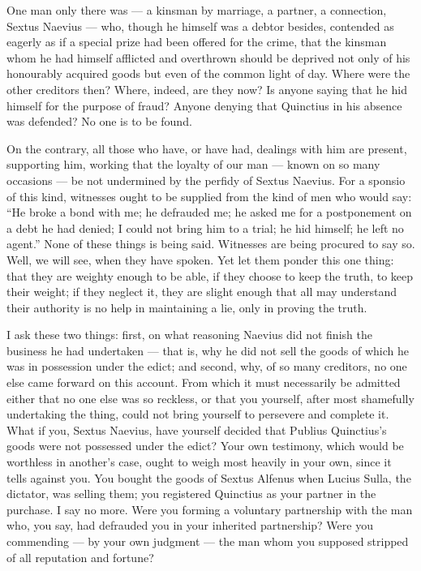  One man only there was --- a kinsman by marriage, a partner, a connection, Sextus Naevius --- who, though he himself was a debtor besides, contended as eagerly as if a special prize had been offered for the crime, that the kinsman whom he had himself afflicted and overthrown should be deprived not only of his honourably acquired goods but even of the common light of day. Where were the other creditors then? Where, indeed, are they now? Is anyone saying that he hid himself for the purpose of fraud? Anyone denying that Quinctius in his absence was defended? No one is to be found.

 On the contrary, all those who have, or have had, dealings with him are present, supporting him, working that the loyalty of our man --- known on so many occasions --- be not undermined by the perfidy of Sextus Naevius. For a sponsio of this kind, witnesses ought to be supplied from the kind of men who would say: ``He broke a bond with me; he defrauded me; he asked me for a postponement on a debt he had denied; I could not bring him to a trial; he hid himself; he left no agent.'' None of these things is being said. Witnesses are being procured to say so. Well, we will see, when they have spoken. Yet let them ponder this one thing: that they are weighty enough to be able, if they choose to keep the truth, to keep their weight; if they neglect it, they are slight enough that all may understand their authority is no help in maintaining a lie, only in proving the truth.

 I ask these two things: first, on what reasoning Naevius did not finish the business he had undertaken --- that is, why he did not sell the goods of which he was in possession under the edict; and second, why, of so many creditors, no one else came forward on this account. From which it must necessarily be admitted either that no one else was so reckless, or that you yourself, after most shamefully undertaking the thing, could not bring yourself to persevere and complete it. What if you, Sextus Naevius, have yourself decided that Publius Quinctius's goods were not possessed under the edict? Your own testimony, which would be worthless in another's case, ought to weigh most heavily in your own, since it tells against you. You bought the goods of Sextus Alfenus when Lucius Sulla, the dictator, was selling them; you registered Quinctius as your partner in the purchase. I say no more. Were you forming a voluntary partnership with the man who, you say, had defrauded you in your inherited partnership? Were you commending --- by your own judgment --- the man whom you supposed stripped of all reputation and fortune?

